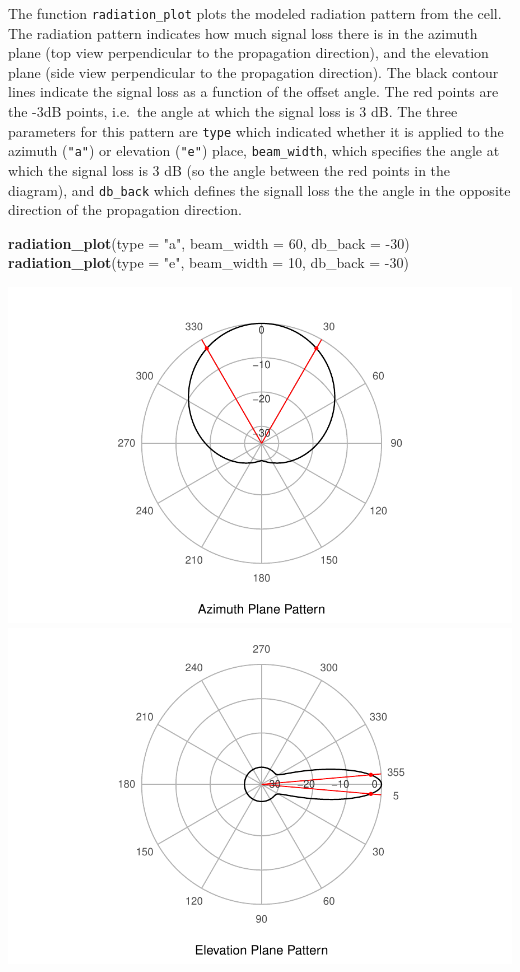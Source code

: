 \documentclass[
]{article}
\newenvironment{Shaded}{\begin{snugshade}}{\end{snugshade}}
\newcommand{\DataTypeTok}[1]{\textcolor[rgb]{0.13,0.29,0.53}{#1}}
\newcommand{\DecValTok}[1]{\textcolor[rgb]{0.00,0.00,0.81}{#1}}
\newcommand{\KeywordTok}[1]{\textcolor[rgb]{0.13,0.29,0.53}{\textbf{#1}}}
\newcommand{\NormalTok}[1]{#1}
\newcommand{\StringTok}[1]{\textcolor[rgb]{0.31,0.60,0.02}{#1}}
\begin{document}
The function \texttt{radiation\_plot} plots the modeled radiation
pattern from the cell. The radiation pattern indicates how much signal
loss there is in the azimuth plane (top view perpendicular to the
propagation direction), and the elevation plane (side view perpendicular
to the propagation direction). The black contour lines indicate the
signal loss as a function of the offset angle. The red points are the
-3dB points, i.e.~the angle at which the signal loss is 3 dB. The three
parameters for this pattern are \texttt{type} which indicated whether it
is applied to the azimuth (\texttt{"a"}) or elevation (\texttt{"e"})
place, \texttt{beam\_width}, which specifies the angle at which the
signal loss is 3 dB (so the angle between the red points in the
diagram), and \texttt{db\_back} which defines the signall loss the the
angle in the opposite direction of the propagation direction.

\begin{Shaded}
\begin{Highlighting}[]
\KeywordTok{radiation_plot}\NormalTok{(}\DataTypeTok{type =} \StringTok{"a"}\NormalTok{, }\DataTypeTok{beam_width =} \DecValTok{60}\NormalTok{, }\DataTypeTok{db_back =} \DecValTok{-30}\NormalTok{)}
\KeywordTok{radiation_plot}\NormalTok{(}\DataTypeTok{type =} \StringTok{"e"}\NormalTok{, }\DataTypeTok{beam_width =} \DecValTok{10}\NormalTok{, }\DataTypeTok{db_back =} \DecValTok{-30}\NormalTok{)}
\end{Highlighting}
\end{Shaded}

\includegraphics[width=0.46\linewidth]{mobvis-mobloc_files/figure-latex/unnamed-chunk-7-1}
\includegraphics[width=0.46\linewidth]{mobvis-mobloc_files/figure-latex/unnamed-chunk-7-2}
\end{document}
